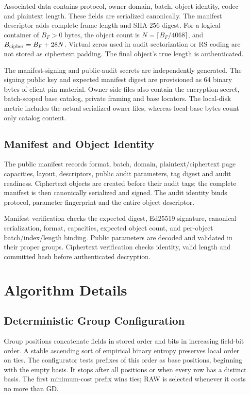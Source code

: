 \documentclass[10pt,journal,onecolumn]{IEEEtran}
\begin{document}
Associated data contains protocol, owner domain, batch, object identity,
codec and plaintext length. These fields are serialized canonically. The
manifest descriptor adds complete frame length and SHA-256 digest. For a
logical container of $B_F>0$ bytes, the object count is
$N=\lceil B_F/4068\rceil$, and $B_{\rm cipher}=B_F+28N$.
Virtual zeros used in audit sectorization or RS coding are not stored as
ciphertext padding. The final object's true length is authenticated.

The manifest-signing and public-audit secrets are independently generated.
The signing public key and expected manifest digest are provisioned as 64 binary
bytes of client pin material. Owner-side files also contain the encryption
secret, batch-scoped base catalog, private framing and base locators.
The local-disk metric includes the actual serialized owner files, whereas
local-base bytes count only catalog content.

\subsection{Manifest and Object Identity}
The public manifest records format, batch, domain, plaintext/ciphertext page
capacities, layout, descriptors, public audit parameters, tag digest and
audit readiness. Ciphertext objects are created before their audit tags;
the complete manifest is then canonically serialized and signed. The audit
identity binds protocol, parameter fingerprint and the entire object descriptor.

Manifest verification checks the expected digest, Ed25519 signature,
canonical serialization, format, capacities, expected object count, and
per-object batch/index/length binding. Public parameters are decoded and
validated in their proper groups. Ciphertext verification checks identity,
valid length and committed hash before authenticated decryption.

\section{Algorithm Details}\label{sec:configuration}
\subsection{Deterministic Group Configuration}
Group positions concatenate fields in stored order and bits in increasing
field-bit order. A stable ascending sort of empirical binary entropy
preserves local order on ties. The configurator tests prefixes of this
order as base positions, beginning with the empty basis. It stops after all
positions or when every row has a distinct basis. The first minimum-cost
prefix wins ties; RAW is selected whenever it costs no more than GD.
\end{document}
